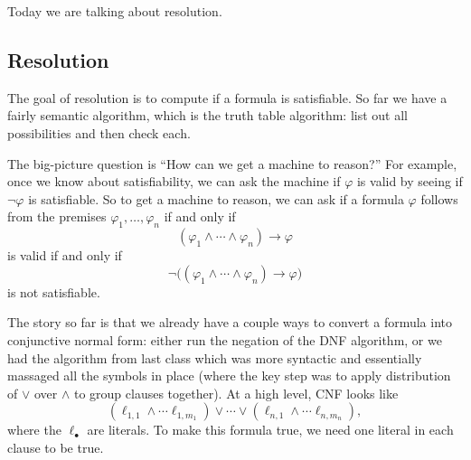 \documentclass[../notes.tex]{subfiles}
\begin{document}

Today we are talking about resolution.

\subsection{Resolution}
The goal of resolution is to compute if a formula is satisfiable. So far we have a fairly semantic algorithm, which is the truth table algorithm: list out all possibilities and then check each.

The big-picture question is ``How can we get a machine to reason?'' For example, once we know about satisfiability, we can ask the machine if $\varphi$ is valid by seeing if $\lnot\varphi$ is satisfiable. So to get a machine to reason, we can ask if a formula $\varphi$ follows from the premises $\varphi_1,\ldots,\varphi_n$ if and only if
\[(\varphi_1\land\cdots\land\varphi_n)\to\varphi\]
is valid if and only if
\[\lnot\big((\varphi_1\land\cdots\land\varphi_n)\to\varphi\big)\]
is not satisfiable.

The story so far is that we already have a couple ways to convert a formula into conjunctive normal form: either run the negation of the DNF algorithm, or we had the algorithm from last class which was more syntactic and essentially massaged all the symbols in place (where the key step was to apply distribution of $\lor$ over $\land$ to group clauses together). At a high level, CNF looks like
\[(\ell_{1,1}\land\cdots\ell_{1,m_1})\lor\cdots\lor(\ell_{n,1}\land\cdots\ell_{n,m_n}),\]
where the $\ell_\bullet$ are literals. To make this formula true, we need one literal in each clause to be true.
\end{document}

